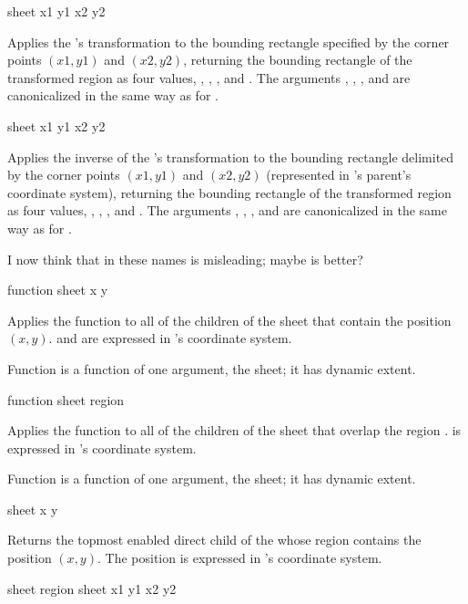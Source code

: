  {sheet x1 y1 x2 y2} 

Applies the  's transformation to the bounding rectangle
specified by the corner points $(x1,y1)$ and $(x2,y2)$, returning the bounding
rectangle of the transformed region as four values, , ,
, and .  The arguments , , , and
 are canonicalized in the same way as for .

 {sheet x1 y1 x2 y2}

Applies the inverse of the  's transformation to the
bounding rectangle delimited by the corner points $(x1,y1)$ and $(x2,y2)$
(represented in 's parent's coordinate system), returning the
bounding rectangle of the transformed region as four values, ,
, , and .  The arguments , ,
, and  are canonicalized in the same way as for
.

 {I now think that  in these names is misleading; maybe
 is better?}

 {function sheet x y}

Applies the function  to all of the children of the sheet
 that contain the position $(x,y)$.   and  are
expressed in 's coordinate system.

Function is a function of one argument, the sheet; it has dynamic extent.

 {function sheet region}

Applies the function  to all of the children of the sheet
 that overlap the region .   is expressed in
's coordinate system.

Function is a function of one argument, the sheet; it has dynamic extent.


 {sheet x y}

Returns the topmost enabled direct child of the   whose
region contains the position $(x,y)$.  The position is expressed in
's coordinate system.

     {sheet region}
 {sheet x1 y1 x2 y2}

